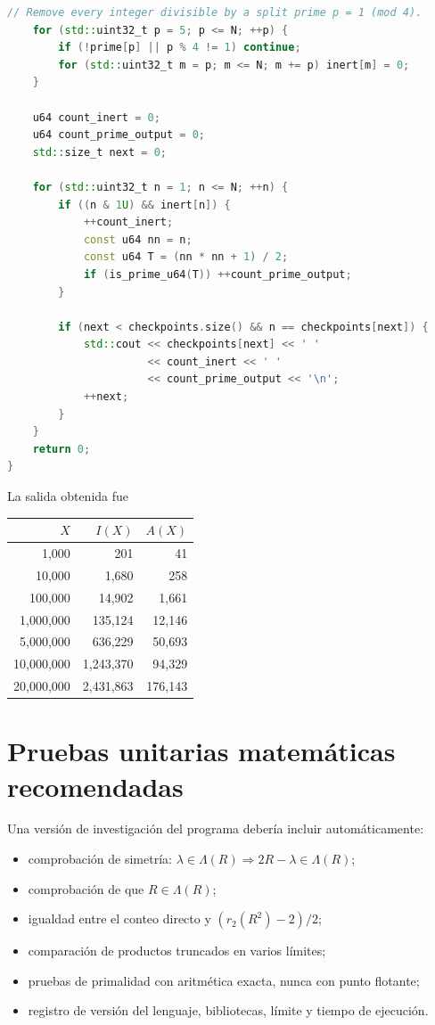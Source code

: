 \documentclass[11pt,a4paper,openany]{report}
\newcommand{\Lam}{\Lambda}
\begin{document}
\begin{lstlisting}[language=C++,caption={Conteo exacto hasta veinte millones con primalidad determinista de 64 bits.},label={lst:cpp-count}]
    // Remove every integer divisible by a split prime p = 1 (mod 4).
    for (std::uint32_t p = 5; p <= N; ++p) {
        if (!prime[p] || p % 4 != 1) continue;
        for (std::uint32_t m = p; m <= N; m += p) inert[m] = 0;
    }

    u64 count_inert = 0;
    u64 count_prime_output = 0;
    std::size_t next = 0;

    for (std::uint32_t n = 1; n <= N; ++n) {
        if ((n & 1U) && inert[n]) {
            ++count_inert;
            const u64 nn = n;
            const u64 T = (nn * nn + 1) / 2;
            if (is_prime_u64(T)) ++count_prime_output;
        }

        if (next < checkpoints.size() && n == checkpoints[next]) {
            std::cout << checkpoints[next] << ' '
                      << count_inert << ' '
                      << count_prime_output << '\n';
            ++next;
        }
    }
    return 0;
}
\end{lstlisting}

La salida obtenida fue
\begin{center}
\begin{tabular}{rrr}
\toprule
\(X\)&\(I(X)\)&\(A(X)\)\\
\midrule
1,000&201&41\\
10,000&1,680&258\\
100,000&14,902&1,661\\
1,000,000&135,124&12,146\\
5,000,000&636,229&50,693\\
10,000,000&1,243,370&94,329\\
20,000,000&2,431,863&176,143\\
\bottomrule
\end{tabular}
\end{center}

\section{Pruebas unitarias matemáticas recomendadas}

Una versión de investigación del programa debería incluir automáticamente:
\begin{itemize}
\item comprobación de simetría: \(\lambda\in\Lam(R)\Rightarrow2R-\lambda\in\Lam(R)\);
\item comprobación de que \(R\in\Lam(R)\);
\item igualdad entre el conteo directo y \((r_2(R^2)-2)/2\);
\item comparación de productos truncados en varios límites;
\item pruebas de primalidad con aritmética exacta, nunca con punto flotante;
\item registro de versión del lenguaje, bibliotecas, límite y tiempo de ejecución.
\end{itemize}
\end{document}
